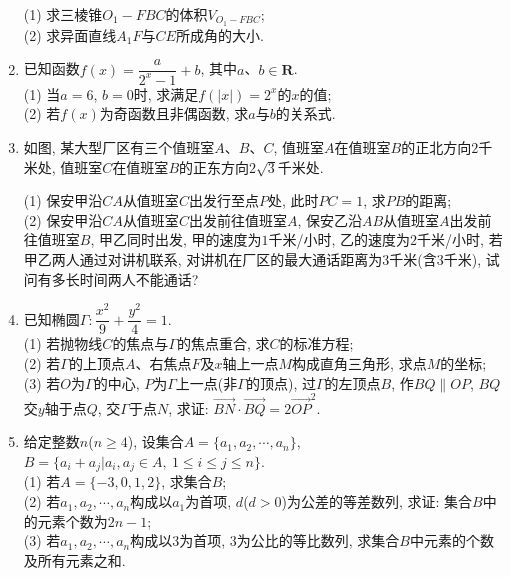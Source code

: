\documentclass[10pt,a4paper]{article}
\begin{document}
\begin{enumerate}[1.]
\begin{center}
\end{center}
(1) 求三棱锥$O_1-FBC$的体积$V_{O_1-FBC}$;\\
(2) 求异面直线$A_1F$与$CE$所成角的大小.
\item 已知函数$f(x)=\dfrac a{2^x-1}+b$, 其中$a$、$b\in \mathbf{R}$.\\
(1) 当$a=6$, $b=0$时, 求满足$f(|x|)=2^x$的$x$的值;\\
(2) 若$f(x)$为奇函数且非偶函数, 求$a$与$b$的关系式.
\item 如图, 某大型厂区有三个值班室$A$、$B$、$C$, 值班室$A$在值班室$B$的正北方向$2$千米处, 值班室$C$在值班室$B$的正东方向$2\sqrt 3$千米处.
\begin{center}
\end{center}
(1) 保安甲沿$CA$从值班室$C$出发行至点$P$处, 此时$PC=1$, 求$PB$的距离;\\
(2) 保安甲沿$CA$从值班室$C$出发前往值班室$A$, 保安乙沿$AB$从值班室$A$出发前往值班室$B$, 甲乙同时出发, 甲的速度为$1$千米/小时, 乙的速度为$2$千米/小时, 若甲乙两人通过对讲机联系, 对讲机在厂区的最大通话距离为$3$千米(含$3$千米), 试问有多长时间两人不能通话?
\item 已知椭圆$\Gamma:\dfrac{x^2}9+\dfrac{y^2}4=1$.\\
(1) 若抛物线$C$的焦点与$\Gamma$的焦点重合, 求$C$的标准方程;\\
(2) 若$\Gamma$的上顶点$A$、右焦点$F$及$x$轴上一点$M$构成直角三角形, 求点$M$的坐标;\\
(3) 若$O$为$\Gamma$的中心, $P$为$\Gamma$上一点(非$\Gamma$的顶点), 过$\Gamma$的左顶点$B$, 作$BQ\parallel OP$, $BQ$交$y$轴于点$Q$, 交$\Gamma$于点$N$, 求证: $\overrightarrow{BN}\cdot \overrightarrow{BQ}=2\overrightarrow{OP}^2$.
\item 给定整数$n$($n\ge 4$), 设集合$A=\{a_1,a_2,\cdots ,a_n\}$, $B=\{a_i+a_j|a_i,a_j\in A,\ 1\le i\le j\le n\}$.\\
(1) 若$A=\{-3,0,1,2\}$, 求集合$B$;\\
(2) 若$a_1,a_2,\cdots ,a_n$构成以$a_1$为首项, $d$($d>0$)为公差的等差数列, 求证: 集合$B$中的元素个数为$2n-1$;\\
(3) 若$a_1,a_2,\cdots ,a_n$构成以$3$为首项, $3$为公比的等比数列, 求集合$B$中元素的个数及所有元素之和.


\end{enumerate}
\end{document}
